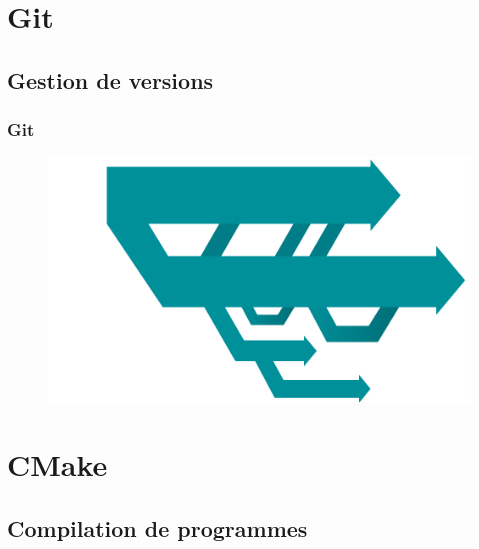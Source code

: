 \documentclass{beamer}
\begin{document}
\section{Git}
\subsection{Gestion de versions}

\begin{frame}
  \frametitle{Git}

    \begin{figure}
    \includegraphics[height=0.7\textheight]{images/branches}
    \end{figure}

\end{frame}



\section{CMake}
\subsection*{Compilation de programmes}
\end{document}
